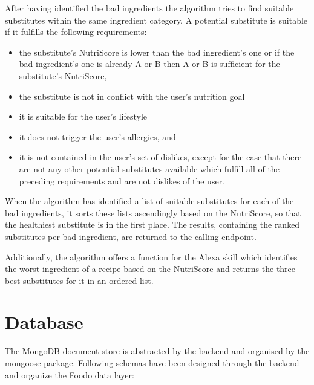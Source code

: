 \bigskip \bigskip
              
After having identified the bad ingredients the algorithm tries to find suitable substitutes within the same ingredient category. A potential substitute is suitable if it fulfills the following requirements:
\begin{itemize}
	\itemsep-0.5em 
	\item  the substitute's NutriScore is lower than the bad ingredient's one or if the bad ingredient's one is already A or B then A or B is sufficient for the substitute's NutriScore,
	\item the substitute is not in conflict with the user's nutrition goal
	\item it is suitable for the user's lifestyle
	\item it does not trigger the user's allergies, and
	\item it is not contained in the user's set of dislikes, except for the case that there are not any other potential substitutes available which fulfill all of the preceding requirements and are not dislikes of the user.
\end{itemize}
When the algorithm has identified a list of suitable substitutes for each of the bad ingredients, it sorts these lists ascendingly based on the NutriScore, so that the healthiest substitute is in the first place. The results, containing the ranked substitutes per bad ingredient, are returned to the calling endpoint.

Additionally, the algorithm offers a function for the Alexa skill which identifies the worst ingredient of a recipe based on the NutriScore and returns the three best substitutes for it in an ordered list. 
\clearpage
\section{Database} \label{database}
The MongoDB document store is abstracted by the backend and organised by the mongoose package. Following schemas have been designed through the backend and organize the Foodo data layer: 

